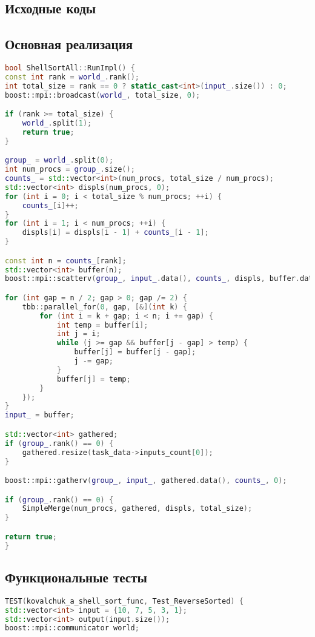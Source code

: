 \documentclass[12pt]{article}
\begin{document}
\newpage
\begin{appendices}
\section{Исходные коды}
\subsection{Основная реализация}
\begin{lstlisting}[language=C++, caption=Фрагмент кода из ops_all.cpp]
bool ShellSortAll::RunImpl() {
const int rank = world_.rank();
int total_size = rank == 0 ? static_cast<int>(input_.size()) : 0;
boost::mpi::broadcast(world_, total_size, 0);

if (rank >= total_size) {
    world_.split(1);
    return true;
}

group_ = world_.split(0);
int num_procs = group_.size();
counts_ = std::vector<int>(num_procs, total_size / num_procs);
std::vector<int> displs(num_procs, 0);
for (int i = 0; i < total_size % num_procs; ++i) {
    counts_[i]++;
}
for (int i = 1; i < num_procs; ++i) {
    displs[i] = displs[i - 1] + counts_[i - 1];
}

const int n = counts_[rank];
std::vector<int> buffer(n);
boost::mpi::scatterv(group_, input_.data(), counts_, displs, buffer.data(), n, 0);

for (int gap = n / 2; gap > 0; gap /= 2) {
    tbb::parallel_for(0, gap, [&](int k) {
        for (int i = k + gap; i < n; i += gap) {
            int temp = buffer[i];
            int j = i;
            while (j >= gap && buffer[j - gap] > temp) {
                buffer[j] = buffer[j - gap];
                j -= gap;
            }
            buffer[j] = temp;
        }
    });
}
input_ = buffer;

std::vector<int> gathered;
if (group_.rank() == 0) {
    gathered.resize(task_data->inputs_count[0]);
}

boost::mpi::gatherv(group_, input_, gathered.data(), counts_, 0);

if (group_.rank() == 0) {
    SimpleMerge(num_procs, gathered, displs, total_size);
}

return true;
}
\end{lstlisting}

\subsection{Функциональные тесты}
\begin{lstlisting}[language=C++, caption=Фрагмент кода из func_all.cpp]
TEST(kovalchuk_a_shell_sort_func, Test_ReverseSorted) {
std::vector<int> input = {10, 7, 5, 3, 1};
std::vector<int> output(input.size());
boost::mpi::communicator world;


\end{lstlisting}
\end{appendices}
\end{document}
